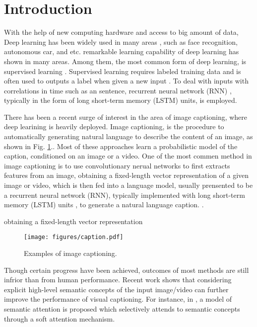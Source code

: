\documentclass[conference]{IEEEtran}
\begin{document}
\IEEEpeerreviewmaketitle



\section{Introduction}

With the help of new computing hardware and access to big amount of data, Deep learning has been widely used in many areas \cite{krizhevsky2012imagenet}, such as face recognition, autonomous car, and etc. remarkable learning capability of deep learning has shown in many areas. Among them, the most common form of deep learning, is supervised learning \cite{lecun2015deep}. Supervised learning requires labeled training data and is often used to outputs a label when given a new input \cite{lecun1998gradient}. To deal with inputs with correlations in time such as an sentence, recurrent neural network (RNN) \cite{mikolov2010recurrent}, typically in the form of long short-term memory (LSTM) units, is employed.

There has been a recent surge of interest in the area of image captioning, where deep learining is heavily deployed. Image captioning, is the procedure to automatically generating natural language to describe the content of an image, as shown in Fig. \ref{cap_fig}.. Most of these approaches learn a probabilistic model of the caption, conditioned on an image or a video. One of the most commen method in image captioning is to use convolutionary nerual networks to first extracts features from an image, obtaining a fixed-length vector representation of a given image or video, which is then fed into a language model, usually prensented to be a recurrent neural network (RNN), typically implemented with long short-term memory (LSTM) units \cite{graves2013speech}, to generate a natural language caption. \cite{vinyals2015show}.

obtaining a fixed-length vector representation
\begin{figure}
  \centering
  \texttt{[image: figures/caption.pdf]}
  \caption{Examples of image captioning.}\label{cap_fig}
\end{figure}

Though certain progress have been achieved, outcomes of most methods are still infrior than from human performance. Recent work shows that considering explicit high-level semantic concepts of the input image/video can further improve the performance of visual captioning. For instance, in \cite{you2016image}, a model of semantic attention is proposed which selectively attends to semantic concepts through a soft attention mechanism.
\end{document}

